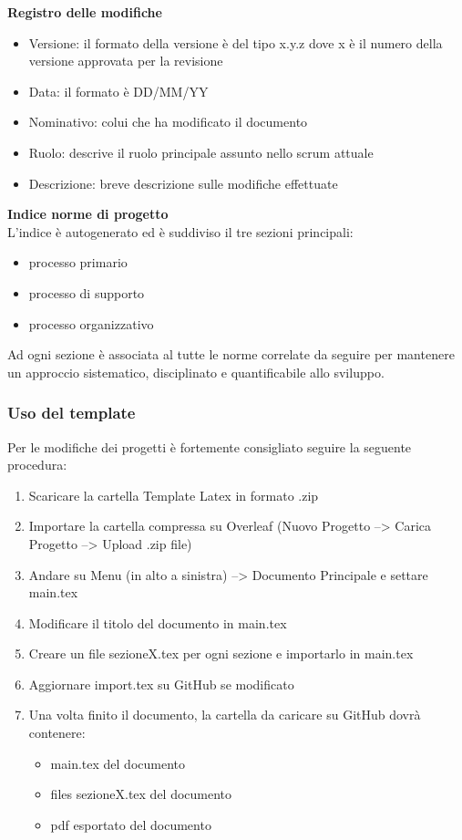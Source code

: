 \textbf{Registro delle modifiche}
\begin{itemize}
\setlength\itemsep{0em}
    \item Versione: il formato della versione è del tipo x.y.z dove x è il numero della versione approvata per la revisione
    \item Data: il formato è DD/MM/YY
    \item Nominativo: colui che ha modificato il documento
    \item Ruolo: descrive il ruolo principale assunto nello scrum attuale
    \item Descrizione: breve descrizione sulle modifiche effettuate
\end{itemize}

\textbf{Indice norme di progetto}\\
L'indice è autogenerato ed è suddiviso il tre sezioni principali:
\begin{itemize}
\setlength\itemsep{0em}
    \item processo primario
    \item processo di supporto
    \item processo organizzativo
\end{itemize}
Ad ogni sezione è associata al tutte le norme correlate da seguire per mantenere un approccio sistematico, disciplinato e quantificabile allo sviluppo.

\subsubsection{Uso del template}
Per le modifiche dei progetti è fortemente consigliato seguire la seguente procedura:
\begin{enumerate}
    \item Scaricare la cartella Template Latex in formato .zip
    \item Importare la cartella compressa su Overleaf (Nuovo Progetto --> Carica Progetto --> Upload .zip file)
    \item Andare su Menu (in alto a sinistra) --> Documento Principale e settare main.tex
    \item Modificare il titolo del documento in main.tex
    \item Creare un file sezioneX.tex per ogni sezione e importarlo in main.tex
    \item Aggiornare import.tex su GitHub se modificato
    
    \item Una volta finito il documento, la cartella da caricare su GitHub dovrà contenere: \begin{itemize}
        \item main.tex del documento
        \item files sezioneX.tex del documento
        \item pdf esportato del documento
    \end{itemize}
    
\end{enumerate}

